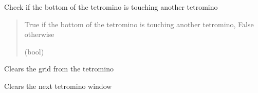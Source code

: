 \documentclass[letterpaper,10pt,english]{sphinxmanual}
\begin{document}
\begin{fulllineitems}
\begin{fulllineitems}
\end{fulllineitems}


\begin{fulllineitems}
\label{\detokenize{tetrominos:tetrominos.Tetromino.check_touch}}
\pysigstartsignatures
{}
\pysigstopsignatures
\sphinxAtStartPar
Check if the bottom of the tetromino is touching another tetromino
\begin{quote}\begin{description}
\sphinxAtStartPar
True if the bottom of the tetromino is touching another tetromino, False otherwise

\sphinxAtStartPar
(bool)

\end{description}\end{quote}

\end{fulllineitems}


\begin{fulllineitems}
\label{\detokenize{tetrominos:tetrominos.Tetromino.clear}}
\pysigstartsignatures
{}
\pysigstopsignatures
\sphinxAtStartPar
Clears the grid from the tetromino

\end{fulllineitems}


\begin{fulllineitems}
\label{\detokenize{tetrominos:tetrominos.Tetromino.clear_next_tetromino_window}}
\pysigstartsignatures
{}
\pysigstopsignatures
\sphinxAtStartPar
Clears the next tetromino window

\end{fulllineitems}



\end{fulllineitems}
\end{document}
